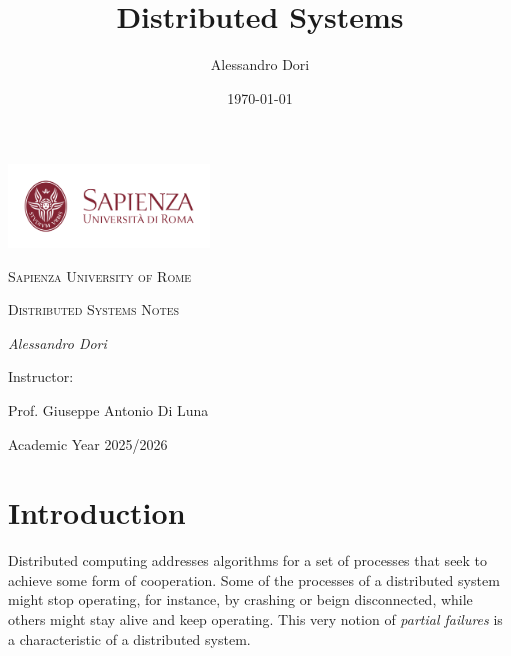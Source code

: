 \documentclass{book}
\title{Distributed Systems}
\author{Alessandro Dori}
\date{\today}
\begin{document}
\begin{titlepage}
    \centering
        \vspace*{1in}
        
        \includegraphics[width=0.4\textwidth]{Immagini/logo-sapienza.png}\par\vspace{1cm}
        
        {\scshape\LARGE Sapienza University of Rome \par}
        \vspace{1.5cm}

         {\scshape\Large Distributed Systems Notes\par}
        \vspace{1.5cm}
        
        {\Large\itshape Alessandro Dori\par}
        
        \vspace{3cm}
        
        Instructor:\par
        {\large Prof. Giuseppe Antonio Di Luna\par}
        
        \vfill
        
        {\large Academic Year 2025/2026\par}
    
\end{titlepage}

\maketitle
\tableofcontents
\setcounter{tocdepth}{2} %
\newpage

\chapter{Introduction}
Distributed computing addresses algorithms for a set of processes that seek to achieve some form of cooperation.
Some of the processes of a distributed system might stop operating, for instance, by crashing or beign disconnected, while others might stay alive and keep operating.
This very notion of \textit{partial failures} is a characteristic of a distributed system.
\end{document}
